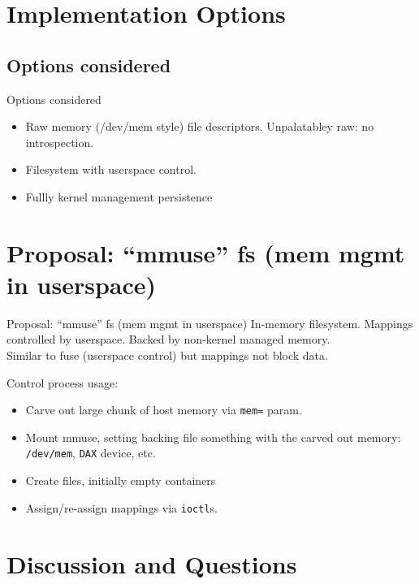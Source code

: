\documentclass{beamer}
\begin{document}
\section{Implementation Options}

\subsection{Options considered}
\begin{frame}{Options considered}
  \begin{itemize}
    \item Raw memory (/dev/mem style) file descriptors. Unpalatabley raw: no introspection.
    \item Filesystem with userspace control.
    \item Fullly kernel management persistence
  \end{itemize}
\end{frame}

\section{Proposal: ``mmuse'' fs (mem mgmt in userspace)}
\begin{frame}{Proposal: ``mmuse'' fs (mem mgmt in userspace)}
  In-memory filesystem. Mappings controlled by userspace. Backed by non-kernel managed memory.\\

  Similar to fuse (userspace control) but mappings not block data.

  Control process usage:
  \begin{itemize}
    \item Carve out large chunk of host memory via \texttt{mem=} param.
    \item Mount mmuse, setting backing file something with the carved out memory: \texttt{/dev/mem}, \texttt{DAX} device, etc.
    \item Create files, initially empty containers
    \item Assign/re-assign mappings via \texttt{ioctl}s.
  \end{itemize}
\end{frame}
\section{Discussion and Questions}
\end{document}
